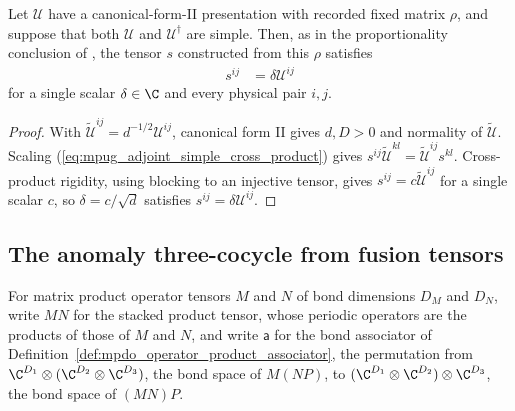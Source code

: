 \begin{lemma}
    \label{thm:mpug_adjoint_simple_scalar}
    \leanok
    Let $\mathcal U$ have a canonical-form-II presentation with recorded
    fixed matrix $\rho$, and suppose that both $\mathcal U$ and
    $\mathcal U^\dagger$ are simple. Then, as in the proportionality
    conclusion of \cite[lines~1255--1325]{FrancoRubio2025MPUGauging}, the
    tensor $s$ constructed from this $\rho$ satisfies
    \begin{align}
        s^{ij} & =\delta\mathcal U^{ij}
    \end{align}
    for a single scalar $\delta\in\C$ and every physical pair $i,j$.
\end{lemma}

\begin{proof}\leanok
    With $\widetilde{\mathcal U}^{ij}=d^{-1/2}\mathcal U^{ij}$,
    canonical form II gives $d,D>0$ and normality of
    $\widetilde{\mathcal U}$. Scaling
    (\ref{eq:mpug_adjoint_simple_cross_product}) gives
    $s^{ij}\widetilde{\mathcal U}^{kl}
        =\widetilde{\mathcal U}^{ij}s^{kl}$.
    Cross-product rigidity, using blocking to an injective tensor, gives
    $s^{ij}=c\widetilde{\mathcal U}^{ij}$ for a single scalar $c$, so
    $\delta=c/\sqrt d$ satisfies $s^{ij}=\delta\mathcal U^{ij}$.
\end{proof}

\subsection{The anomaly three-cocycle from fusion tensors}

For matrix product operator tensors $M$ and $N$ of bond dimensions $D_M$
and $D_N$, write $MN$ for the stacked product tensor, whose periodic operators
are the products of those of $M$ and $N$, and write $\mathsf a$ for the
bond associator of Definition~\ref{def:mpdo_operator_product_associator},
the permutation from $\C^{D_1}\otimes(\C^{D_2}\otimes\C^{D_3})$, the bond
space of $M(NP)$, to $(\C^{D_1}\otimes\C^{D_2})\otimes\C^{D_3}$, the bond
space of $(MN)P$.

